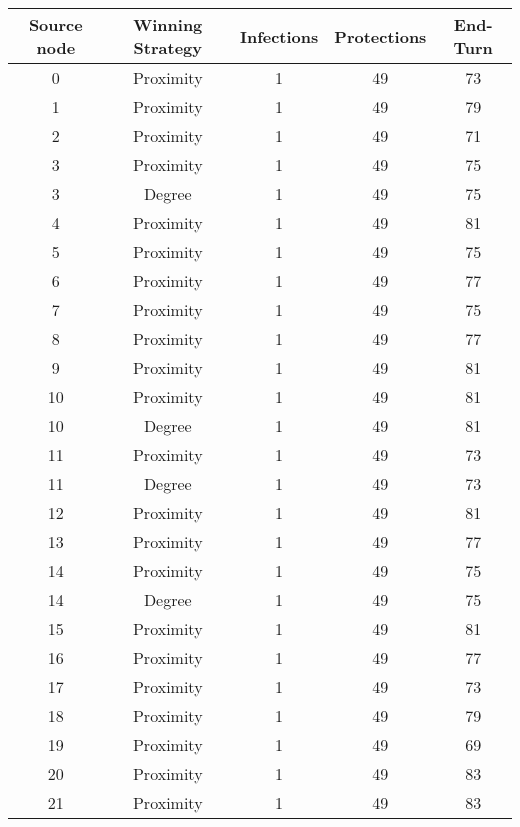 \documentclass[results.tex]{subfiles}
\begin{document}
\begin{center}
  \begin{tabular}{| c || c | c | c | c |}
    \hline
    {\bfseries Source node} & {\bfseries Winning Strategy} & {\bfseries Infections} & {\bfseries Protections} & {\bfseries End-Turn} \\  %
    \hline\hline
    0 & Proximity & 1 & 49 & 73 \\ 
    \hline
    1 & Proximity & 1 & 49 & 79 \\ 
    \hline
    2 & Proximity & 1 & 49 & 71 \\ 
    \hline
    3 & Proximity & 1 & 49 & 75 \\ 
    \hline
    3 & Degree & 1 & 49 & 75 \\ 
    \hline
    4 & Proximity & 1 & 49 & 81 \\ 
    \hline
    5 & Proximity & 1 & 49 & 75 \\ 
    \hline
    6 & Proximity & 1 & 49 & 77 \\ 
    \hline
    7 & Proximity & 1 & 49 & 75 \\ 
    \hline
    8 & Proximity & 1 & 49 & 77 \\ 
    \hline
    9 & Proximity & 1 & 49 & 81 \\ 
    \hline
    10 & Proximity & 1 & 49 & 81 \\ 
    \hline
    10 & Degree & 1 & 49 & 81 \\ 
    \hline
    11 & Proximity & 1 & 49 & 73 \\ 
    \hline
    11 & Degree & 1 & 49 & 73 \\ 
    \hline
    12 & Proximity & 1 & 49 & 81 \\ 
    \hline
    13 & Proximity & 1 & 49 & 77 \\ 
    \hline
    14 & Proximity & 1 & 49 & 75 \\ 
    \hline
    14 & Degree & 1 & 49 & 75 \\ 
    \hline
    15 & Proximity & 1 & 49 & 81 \\ 
    \hline
    16 & Proximity & 1 & 49 & 77 \\ 
    \hline
    17 & Proximity & 1 & 49 & 73 \\ 
    \hline
    18 & Proximity & 1 & 49 & 79 \\ 
    \hline
    19 & Proximity & 1 & 49 & 69 \\ 
    \hline
    20 & Proximity & 1 & 49 & 83 \\ 
    \hline
    21 & Proximity & 1 & 49 & 83 \\ 

\end{tabular}
\end{center}
\end{document}
